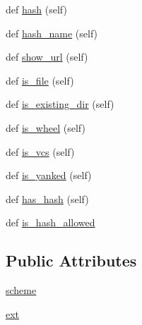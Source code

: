 \begin{DoxyCompactItemize}
\item 
def \hyperlink{classpip_1_1__internal_1_1models_1_1link_1_1Link_aba1a788bf3e66def876d1e98d0863a6f}{hash} (self)
\item 
def \hyperlink{classpip_1_1__internal_1_1models_1_1link_1_1Link_a5932f0573e6c0401b0cc2d240a571b87}{hash\+\_\+name} (self)
\item 
def \hyperlink{classpip_1_1__internal_1_1models_1_1link_1_1Link_a418b06104b13c1bec37b81e3da36f7b5}{show\+\_\+url} (self)
\item 
def \hyperlink{classpip_1_1__internal_1_1models_1_1link_1_1Link_ad31f2e274ec43b37edbdd04fc63ace63}{is\+\_\+file} (self)
\item 
def \hyperlink{classpip_1_1__internal_1_1models_1_1link_1_1Link_a9ea5a938ce91cd66bdb1667222406d60}{is\+\_\+existing\+\_\+dir} (self)
\item 
def \hyperlink{classpip_1_1__internal_1_1models_1_1link_1_1Link_aa8c199c20f861da7fda55bd4e757bb6e}{is\+\_\+wheel} (self)
\item 
def \hyperlink{classpip_1_1__internal_1_1models_1_1link_1_1Link_af4129a09683b1c34bedcc15e50da66b5}{is\+\_\+vcs} (self)
\item 
def \hyperlink{classpip_1_1__internal_1_1models_1_1link_1_1Link_af6297fe12b5d3bfa7c60912b9cda624d}{is\+\_\+yanked} (self)
\item 
def \hyperlink{classpip_1_1__internal_1_1models_1_1link_1_1Link_a3a952853c3713642c7767e0a1cf31ad0}{has\+\_\+hash} (self)
\item 
def \hyperlink{classpip_1_1__internal_1_1models_1_1link_1_1Link_acae5f328c80fa8d8efc51d59735a958c}{is\+\_\+hash\+\_\+allowed}
\end{DoxyCompactItemize}
\subsection*{Public Attributes}
\begin{DoxyCompactItemize}
\item 
\hyperlink{classpip_1_1__internal_1_1models_1_1link_1_1Link_afdca198c0e56ff076b7d7eaef8be922e}{scheme}
\item 
\hyperlink{classpip_1_1__internal_1_1models_1_1link_1_1Link_a638d7375efa13338c3579494c34ed159}{ext}
\end{DoxyCompactItemize}
